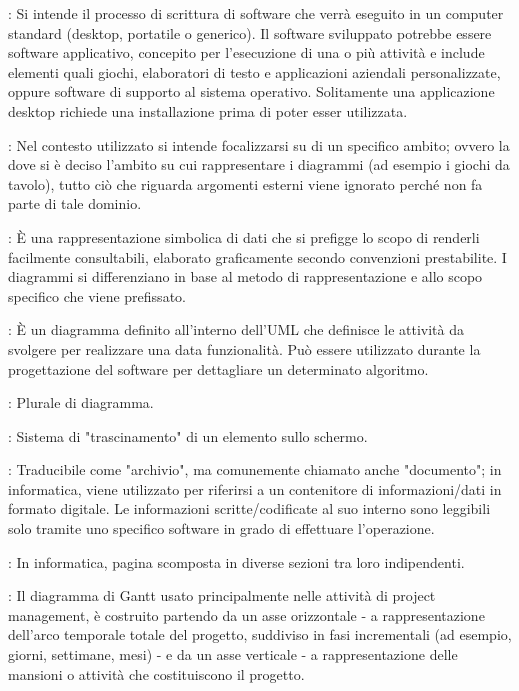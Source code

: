 {	    : Si intende il processo di scrittura di software che verrà eseguito in un computer standard (desktop, portatile o generico). Il software sviluppato potrebbe essere software applicativo, concepito per l'esecuzione di una o più attività e include elementi quali giochi, elaboratori di testo e applicazioni aziendali personalizzate, oppure software di supporto al sistema operativo. Solitamente una applicazione desktop richiede una installazione prima di poter esser utilizzata.
	     
	    : Nel contesto utilizzato si intende focalizzarsi su di un specifico ambito; ovvero la dove si è deciso l’ambito su cui rappresentare i diagrammi (ad esempio i giochi da tavolo), tutto ciò che riguarda argomenti esterni viene ignorato perché non fa parte di tale dominio.

		: È una rappresentazione simbolica di dati che si prefigge lo scopo di renderli facilmente consultabili, elaborato graficamente secondo convenzioni prestabilite. I diagrammi si differenziano in base al metodo di rappresentazione e allo scopo specifico che viene prefissato.
	
		  : È un diagramma definito all'interno dell’UML che definisce le attività da svolgere per realizzare una data funzionalità. Può essere utilizzato durante la progettazione del software per dettagliare un determinato algoritmo.
		  	
		: Plurale di diagramma.
		
		: Sistema di "trascinamento" di un elemento sullo schermo.
		
	
		: Traducibile come "archivio", ma comunemente chiamato anche "documento"; in informatica, viene utilizzato per riferirsi a un contenitore di informazioni/dati in formato digitale. Le informazioni scritte/codificate al suo interno sono leggibili solo tramite uno specifico software in grado di effettuare l'operazione.
		
		: In informatica, pagina scomposta in diverse sezioni tra loro indipendenti.
		
		: Il diagramma di Gantt usato principalmente nelle attività di project management, è costruito partendo da un asse orizzontale - a rappresentazione dell'arco temporale totale del progetto, suddiviso in fasi incrementali (ad esempio, giorni, settimane, mesi) - e da un asse verticale - a rappresentazione delle mansioni o attività che costituiscono il progetto.
		
}
